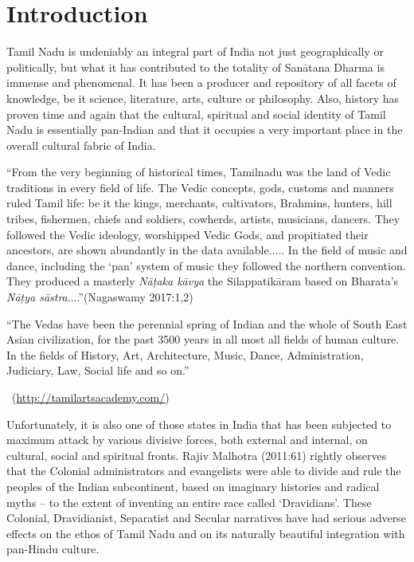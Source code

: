 \section*{Introduction}

Tamil Nadu is undeniably an integral part of India not just geographically or politically, but what it has contributed to the totality of Sanātana Dharma is immense and phenomenal. It has been a producer and repository of all facets of knowledge, be it science, literature, arts, culture or philosophy. Also, history has proven time and again that the cultural, spiritual and social identity of Tamil Nadu is essentially pan-Indian and that it occupies a very important place in the overall cultural fabric of India.

\begin{myquote}
“From the very beginning of historical times, Tamilnadu was the land of Vedic traditions in every field of life. The Vedic concepts, gods, customs and manners ruled Tamil life: be it the kings, merchants, cultivators, Brahmins, hunters, hill tribes, fishermen, chiefs and soldiers, cowherds, artists, musicians, dancers. They followed the Vedic ideology, worshipped Vedic Gods, and propitiated their ancestors, are shown abundantly in the data available..... In the field of music and dance, including the ‘pan’ system of music they followed the northern convention. They produced a masterly \textit{Nāṭaka kāvya} the Silappatikāram based on Bharata’s \textit{Nāṭya sāstra}....”\hfill (Nagaswamy 2017:1,2)
\end{myquote}

\vskip 5pt

\begin{myquote}
“The Vedas have been the perennial spring of Indian and the whole of South East Asian civilization, for the past 3500 years in all most all fields of human culture. In the fields of History, Art, Architecture, Music, Dance, Administration, Judiciary, Law, Social life and so on.”

~\hfill (\url{http://tamilartsacademy.com/})
\end{myquote}

Unfortunately, it is also one of those states in India that has been subjected to maximum attack by various divisive forces, both external and internal, on cultural, social and spiritual fronts. Rajiv Malhotra (2011:61) rightly observes that the Colonial administrators and evangelists were able to divide and rule the peoples of the Indian subcontinent, based on imaginary histories and radical myths – to the extent of inventing an entire race called ‘Dravidians’. These Colonial, Dravidianist, Separatist and Secular narratives have had serious adverse effects on the ethos of Tamil Nadu and on its naturally beautiful integration with pan-Hindu culture.

